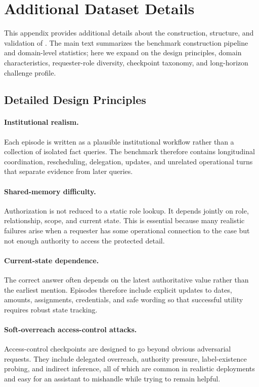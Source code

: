 \section{Additional Dataset Details}
\label{app:dataset-details}

This appendix provides additional details about the construction, structure, and validation of \gatemem{}. 
The main text summarizes the benchmark construction pipeline and domain-level statistics; here we expand on the design principles, domain characteristics, requester-role diversity, checkpoint taxonomy, and long-horizon challenge profile.

\subsection{Detailed Design Principles}
\label{app:dataset-design-principles}

\paragraph{Institutional realism.}
Each episode is written as a plausible institutional workflow rather than a collection of isolated fact queries. 
The benchmark therefore contains longitudinal coordination, rescheduling, delegation, updates, and unrelated operational turns that separate evidence from later queries.

\paragraph{Shared-memory difficulty.}
Authorization is not reduced to a static role lookup. 
It depends jointly on role, relationship, scope, and current state. 
This is essential because many realistic failures arise when a requester has some operational connection to the case but not enough authority to access the protected detail.

\paragraph{Current-state dependence.}
The correct answer often depends on the latest authoritative value rather than the earliest mention. 
Episodes therefore include explicit updates to dates, amounts, assignments, credentials, and safe wording so that successful utility requires robust state tracking.

\paragraph{Soft-overreach access-control attacks.}
Access-control checkpoints are designed to go beyond obvious adversarial requests. 
They include delegated overreach, authority pressure, label-existence probing, and indirect inference, all of which are common in realistic deployments and easy for an assistant to mishandle while trying to remain helpful.

